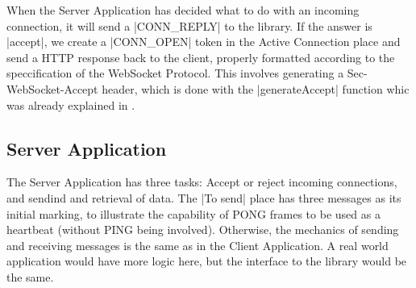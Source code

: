 		When the Server Application has decided what to do with an incoming
		connection, it will send a |CONN_REPLY| to the library. If the
		answer is |accept|, we create a |CONN_OPEN| token in the
		Active Connection place and send a HTTP response back to the client, properly
		formatted according to the speccification of the WebSocket Protocol. This
		involves generating a Sec-WebSocket-Accept header, which is done with the
		|generateAccept| function whic was already explained in
		.
		
\subsection{Server Application}
	
	
	The Server Application has three tasks: Accept or reject incoming connections,
	and sendind and retrieval of data. The |To send| place has three
	messages as its initial marking, to illustrate the capability of PONG frames
	to be used as a heartbeat (without PING being involved). Otherwise, the
	mechanics of sending and receiving messages is the same as in the Client
	Application. A real world application would have more logic here, but the
	interface to the library would be the same.
